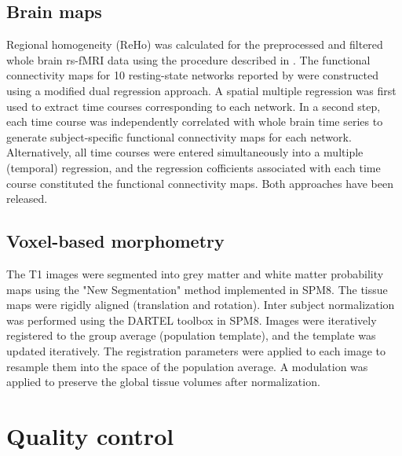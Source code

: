 \documentclass[preprint,12pt,3p]{elsarticle}
\begin{document}
\subsection{Brain maps}
Regional homogeneity (ReHo) was calculated for the preprocessed and filtered whole brain rs-fMRI data using the procedure described in \citep{zang2004regional}. The functional connectivity maps for 10 resting-state networks reported by \cite{smith2009correspondence} were constructed using a modified dual regression approach. A spatial multiple regression was first used to extract time courses corresponding to each network. In a second step, each time course was independently correlated with whole brain time series to generate subject-specific functional connectivity maps for each network. Alternatively, all time courses were entered simultaneously into a multiple (temporal) regression, and the regression cofficients associated with each time course constituted the functional connectivity maps. Both approaches have been released.

\subsection{Voxel-based morphometry}
The T1 images were segmented into grey matter and white matter probability maps using the "New Segmentation" method implemented in SPM8. The tissue maps were rigidly aligned (translation and rotation). Inter subject normalization was performed using the DARTEL toolbox in SPM8. Images were iteratively registered to the group average (population template), and the template was updated iteratively. The registration parameters were applied to each image to resample them into the space of the population average. A modulation was applied to preserve the global tissue volumes after normalization.



\section{Quality control}
\end{document}
